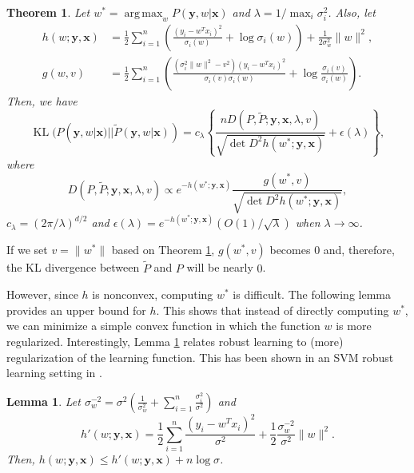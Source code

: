 \documentclass[10pt,twocolumn]{IEEEtran}
\newtheorem{theorem}{Theorem}
\newtheorem{lemma}{Lemma}
\DeclareMathOperator*{\argmax}{arg\,max}
\DeclareMathOperator{\KL}{KL}
\DeclareMathOperator{\det}{det}
\begin{document}
	\begin{theorem} \label{thm:kl-approx}
		Let $w^* = \argmax_w P(\mathbf{y}, w|\mathbf{x})$ and $\lambda = 1 / \max_i \sigma_i^2$. Also, let
		\begin{align}
			h(w; \mathbf{y}, \mathbf{x}) &= \frac12 \sum_{i=1}^n \left( \frac{(y_i - w^T x_i)^2}{\sigma_i(w)} + \log \sigma_i(w) \right) + \frac{1}{2\sigma_w^2} \|w\|^2, \\
			g(w, v) &= \frac12 \sum_{i=1}^n \left( \frac{(\sigma_i^2 \|w\|^2 - v^2)(y_i - w^T x_i)^2}{\sigma_i(v) \sigma_i(w)} + \log \frac{\sigma_i(v)}{\sigma_i(w)} \right).
		\end{align}
		Then, we have
		\begin{equation}
			\KL(P(\mathbf{y}, w|\mathbf{x}) || \tilde{P}(\mathbf{y}, w|\mathbf{x})) = c_\lambda \left\{ \frac{n D(P, \tilde{P}; \mathbf{y}, \mathbf{x}, \lambda, v)}{\sqrt{\det D^2 h(w^*; \mathbf{y}, \mathbf{x})}} + \epsilon(\lambda) \right\},
		\end{equation}
		where
		\begin{equation}
			D(P, \tilde{P}; \mathbf{y}, \mathbf{x}, \lambda, v) \propto e^{-h(w^*;\mathbf{y},\mathbf{x})} \frac{g(w^*, v)}{\sqrt{\det D^2 h(w^*; \mathbf{y}, \mathbf{x})}},
		\end{equation}
		$c_\lambda = (2\pi/\lambda)^{d/2}$ and $\epsilon(\lambda) = e^{-h(w^*;\mathbf{y},\mathbf{x})}(O(1)/\sqrt{\lambda})$ when $\lambda \to \infty$.
	\end{theorem}
	
	If we set $v = \|w^*\|$ based on Theorem \ref{thm:kl-approx}, $g(w^*, v)$ becomes $0$ and, therefore, the KL divergence between $\tilde{P}$ and $P$ will be nearly $0$.
	
	However, since $h$ is nonconvex, computing $w^*$ is difficult. The following lemma provides an upper bound for $h$. This shows that instead of directly computing $w^*$, we can minimize a simple convex function in which the function $w$ is more regularized. Interestingly, Lemma \ref{lem:h-upper-bound} relates robust learning to (more) regularization of the learning function. This has been shown in an SVM robust learning setting in \cite{xu2009robustness}.
	
	\begin{lemma} \label{lem:h-upper-bound}
		Let $\sigma_w^{-2} = \sigma^2 ( \frac{1}{\sigma_w^2} + \sum_{i=1}^n \frac{\sigma_i^2}{\sigma^2} )$ and
		\begin{equation}
			h'(w; \mathbf{y}, \mathbf{x}) = \frac12 \sum_{i=1}^n \frac{(y_i - w^T x_i)^2}{\sigma^2} + \frac12 \frac{\sigma_w^{-2}}{\sigma^2} \|w\|^2.
		\end{equation}
		Then, $h(w; \mathbf{y}, \mathbf{x}) \le h'(w; \mathbf{y}, \mathbf{x}) + n \log \sigma$.
	\end{lemma}
	
\end{document}
